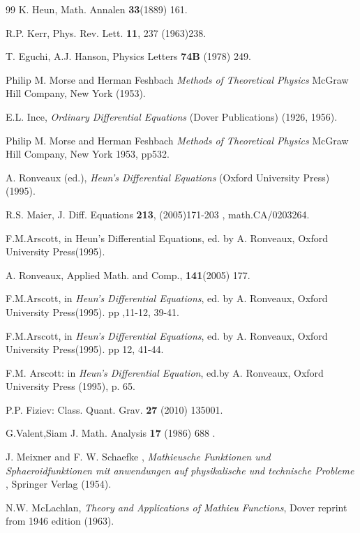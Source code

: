 \documentclass{article}
\begin{document}
\begin{thebibliography}{99}
 K. Heun, Math. Annalen \textbf{33}(1889) 161.

 R.P. Kerr, Phys. Rev. Lett. \textbf{11}, 237 (1963)238.

 T. Eguchi, A.J. Hanson, Physics Letters
\textbf{74B} (1978) 249.


 Philip M. Morse and Herman Feshbach \textit{Methods of Theoretical Physics} McGraw Hill Company, New York (1953).

 E.L. Ince, \textit{Ordinary Differential  Equations} (Dover Publications) (1926, 1956).

 Philip M. Morse and Herman Feshbach \textit{Methods of Theoretical Physics} McGraw Hill Company, New York 1953, pp532.

 A. Ronveaux (ed.), \textit{Heun's Differential Equations} (Oxford University Press) (1995).



 R.S. Maier,   J. Diff. Equations \textbf{213}, (2005)171-203
, math.CA/0203264.

 F.M.Arscott, in Heun's Differential Equations, ed. by A. Ronveaux, Oxford University Press(1995).

 A. Ronveaux, Applied Math. and Comp., \textbf{141}(2005) 177.

 F.M.Arscott, in \emph{ Heun's Differential Equations}, ed. by A. Ronveaux, Oxford University Press(1995).  pp ,11-12, 39-41.

 F.M.Arscott, in \emph{Heun's Differential Equations}, ed. by A. Ronveaux, Oxford University Press(1995). pp 12, 41-44.

 F.M. Arscott: in \emph{Heun's Differential Equation}, ed.by A. Ronveaux, Oxford University Press (1995), p. 65.

 P.P. Fiziev: Class. Quant. Grav. \textbf{27} (2010) 135001.

 G.Valent,Siam J.  Math. Analysis \textbf {17} (1986) 688 .

 J. Meixner and F. W.
Schaefke , \textit{Mathieusche Funktionen und Sphaeroidfunktionen
mit anwendungen auf physikalische und technische Probleme} ,
Springer Verlag (1954).

 N.W. McLachlan, \textit{Theory and
Applications of Mathieu Functions}, Dover reprint from 1946
edition (1963).



\end{thebibliography}
\end{document}
